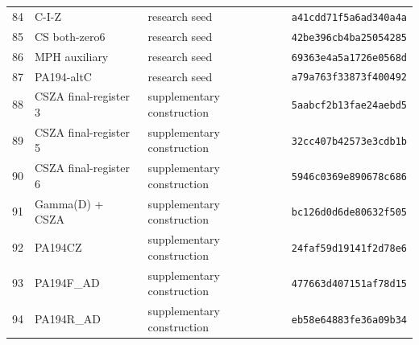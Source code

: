 \begin{longtable}{p{.06\linewidth}>{\raggedright\arraybackslash}p{.30\linewidth}>{\raggedright\arraybackslash}p{.21\linewidth}p{.31\linewidth}}
84 & C-I-Z & research seed & \texttt{a41cdd71f5a6ad340a4a} \\
85 & CS both-zero6 & research seed & \texttt{42be396cb4ba25054285} \\
86 & MPH auxiliary & research seed & \texttt{69363e4a5a1726e0568d} \\
87 & PA194-altC & research seed & \texttt{a79a763f33873f400492} \\
88 & CSZA final-register 3 & supplementary construction & \texttt{5aabcf2b13fae24aebd5} \\
89 & CSZA final-register 5 & supplementary construction & \texttt{32cc407b42573e3cdb1b} \\
90 & CSZA final-register 6 & supplementary construction & \texttt{5946c0369e890678c686} \\
91 & Gamma(D) + CSZA & supplementary construction & \texttt{bc126d0d6de80632f505} \\
92 & PA194CZ & supplementary construction & \texttt{24faf59d19141f2d78e6} \\
93 & PA194F\_AD & supplementary construction & \texttt{477663d407151af78d15} \\
94 & PA194R\_AD & supplementary construction & \texttt{eb58e64883fe36a09b34} \\
\bottomrule\end{longtable}
